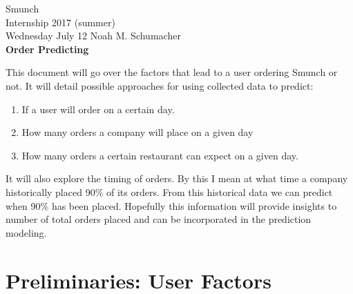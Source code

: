 \documentclass[12pt]{article}
\begin{document}
\thispagestyle{empty}

\begin{center}

\large Smunch\\
Internship 2017 (summer)\\
\vspace{0.5cm}
\normalsize 
Wednesday July 12 \hfill Noah M. Schumacher\\
\vspace{0.25cm}
\Large {\textbf{Order Predicting}}\normalsize
\end{center}

This document will go over the factors that lead to a user ordering Smunch or not. It will detail possible approaches for using collected data to predict:
\begin{enumerate}
  \item If a user will order on a certain day.
  \item How many orders a company will place on a given day
  \item How many orders a certain restaurant can expect on a given day.
\end{enumerate}
It will also explore the timing of orders. By this I mean at what time a company historically placed 90\% of its orders. From this historical data we can predict when 90\% has been placed. Hopefully this information will provide insights to number of total orders placed and can be incorporated in the prediction modeling.\\

\section{Preliminaries: User Factors}
\end{document}
